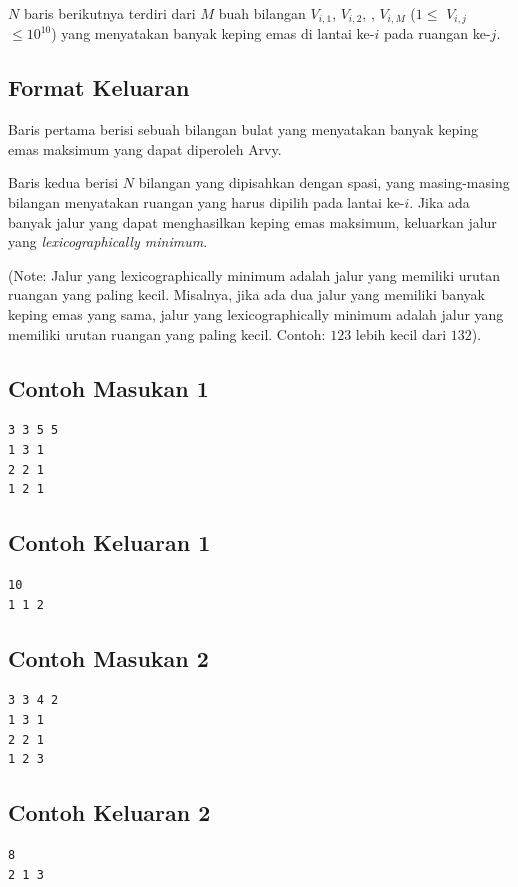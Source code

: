 \documentclass{article}
\begin{document}
$N$ baris berikutnya terdiri dari $M$ buah bilangan $V_{i,1}$, $V_{i,2}$, \cdots, $V_{i,M}$ ($1 \leq$ $V_{i,j}$ $ \leq 10^{10}$) yang menyatakan banyak keping emas di lantai ke-$i$ pada ruangan ke-$j$.

\subsection*{Format Keluaran}
Baris pertama berisi sebuah bilangan bulat yang menyatakan banyak keping emas maksimum yang dapat diperoleh Arvy.

Baris kedua berisi $N$ bilangan yang dipisahkan dengan spasi, yang masing-masing bilangan menyatakan ruangan yang harus dipilih pada lantai ke-$i$. Jika ada banyak jalur yang dapat menghasilkan keping emas maksimum, keluarkan jalur yang \textit{lexicographically minimum}.

(Note: Jalur yang lexicographically minimum adalah jalur yang memiliki urutan ruangan yang paling kecil. Misalnya, jika ada dua jalur yang memiliki banyak keping emas yang sama, jalur yang lexicographically minimum adalah jalur yang memiliki urutan ruangan yang paling kecil. Contoh: $1 2 3$ lebih kecil dari $1 3 2$).

\begin{multicols}{2}
\subsection*{Contoh Masukan 1}
\begin{lstlisting}
3 3 5 5
1 3 1
2 2 1
1 2 1
\end{lstlisting}
\columnbreak

\subsection*{Contoh Keluaran 1}
\begin{lstlisting}
10
1 1 2
\end{lstlisting}
\vfill
\null
\end{multicols}

\begin{multicols}{2}
\subsection*{Contoh Masukan 2}
\begin{lstlisting}
3 3 4 2
1 3 1
2 2 1
1 2 3
\end{lstlisting}
\columnbreak

\subsection*{Contoh Keluaran 2}
\begin{lstlisting}
8
2 1 3
\end{lstlisting}
\vfill
\null
\end{multicols}
\end{document}
